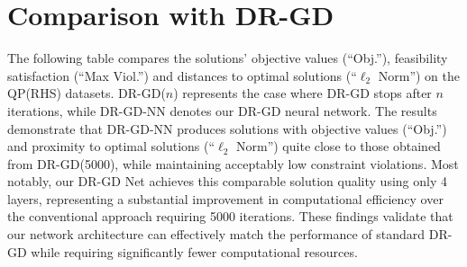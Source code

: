 \documentclass[10pt]{article} %
\begin{document}
\clearpage
\newpage
\section{Comparison with DR-GD}


The following table compares the solutions' objective values (\enquote{Obj.}), feasibility satisfaction (\enquote{Max Viol.}) and distances to optimal solutions (\enquote{$\ell_2$ Norm}) on the QP(RHS) datasets. DR-GD($n$) represents the case where DR-GD stops after $n$ iterations, while DR-GD-NN denotes our DR-GD neural network.
The results demonstrate that DR-GD-NN produces solutions with objective values (\enquote{Obj.}) and proximity to optimal solutions (\enquote{$\ell_2$ Norm}) quite close to those obtained from DR-GD(5000), while maintaining acceptably low constraint violations. Most notably, our DR-GD Net achieves this comparable solution quality using only 4 layers, representing a substantial improvement in computational efficiency over the conventional approach requiring 5000 iterations. 
These findings validate that our network architecture can effectively match the performance of standard DR-GD while requiring significantly fewer computational resources. 
\end{document}
